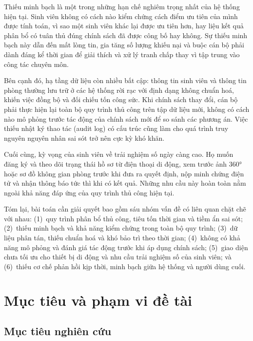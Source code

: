 \documentclass[a4paper,12pt,openany,oneside]{report}
\begin{document}
Thiếu minh bạch là một trong những hạn chế nghiêm trọng nhất của hệ thống hiện
tại. Sinh viên không có cách nào kiểm chứng cách điểm ưu tiên của mình được
tính toán, vì sao một sinh viên khác lại được ưu tiên hơn, hay liệu kết quả phân
bổ có tuân thủ đúng chính sách đã được công bố hay không. Sự thiếu minh bạch
này dẫn đến mất lòng tin, gia tăng số lượng khiếu nại và buộc cán bộ phải dành
đáng kể thời gian để giải thích và xử lý tranh chấp thay vì tập trung vào công
tác chuyên môn.

Bên cạnh đó, hạ tầng dữ liệu còn nhiều bất cập: thông tin sinh viên và thông
tin phòng thường lưu trữ ở các hệ thống rời rạc với định dạng không chuẩn hoá,
khiến việc đồng bộ và đối chiếu tốn công sức. Khi chính sách thay đổi, cán bộ
phải thực hiện lại toàn bộ quy trình thủ công trên tập dữ liệu mới, không có
cách nào mô phỏng trước tác động của chính sách mới để so sánh các phương án.
Việc thiếu nhật ký thao tác (audit log) có cấu trúc cũng làm cho quá trình truy
nguyên nguyên nhân sai sót trở nên cực kỳ khó khăn.

Cuối cùng, kỳ vọng của sinh viên về trải nghiệm số ngày càng cao. Họ muốn đăng
ký và theo dõi trạng thái hồ sơ từ điện thoại di động, xem trước ảnh 360° hoặc
sơ đồ không gian phòng trước khi đưa ra quyết định, nộp minh chứng điện tử và
nhận thông báo tức thì khi có kết quả. Những nhu cầu này hoàn toàn nằm ngoài
khả năng đáp ứng của quy trình thủ công hiện tại.

Tóm lại, bài toán cần giải quyết bao gồm sáu nhóm vấn đề có liên quan chặt chẽ
với nhau: (1)~quy trình phân bổ thủ công, tiêu tốn thời gian và tiềm ẩn sai sót;
(2)~thiếu minh bạch và khả năng kiểm chứng trong toàn bộ quy trình; (3)~dữ liệu
phân tán, thiếu chuẩn hoá và khó bảo trì theo thời gian; (4)~không có khả năng
mô phỏng và đánh giá tác động trước khi áp dụng chính sách; (5)~giao diện chưa
tối ưu cho thiết bị di động và nhu cầu trải nghiệm số của sinh viên; và
(6)~thiếu cơ chế phản hồi kịp thời, minh bạch giữa hệ thống và người dùng cuối.

\section{Mục tiêu và phạm vi đề tài}

\subsection{Mục tiêu nghiên cứu}
\end{document}
